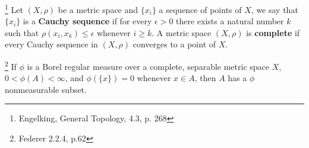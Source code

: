 \begin{definition}
\footnote{Engelking, General Topology, 4.3, p. 268}
Let $(X,\rho)$ be a metric space and $\{x_i\}$ a sequence of points of $X$, we
say that $\{x_i\}$ is a \textbf{Cauchy sequence} 
if for every $\epsilon>0$ there
exists a natural number $k$ such that $\rho(x_i,x_k)\leq\epsilon$ whenever 
$i\geq k$. A metric space $(X,\rho)$ is \textbf{complete} 
if every Cauchy 
sequence in $(X,\rho)$ converges to a point of $X$.
\end{definition}

\begin{theorem}
\footnote{Federer 2.2.4, p.62} 
If $\phi$ is a Borel regular measure over a complete, separable metric space
$X$, $0<\phi(A)<\infty$, and $\phi(\{x\})=0$ whenever $x\in A$, then $A$ has a
$\phi$ nonmeasurable subset.
\end{theorem}
